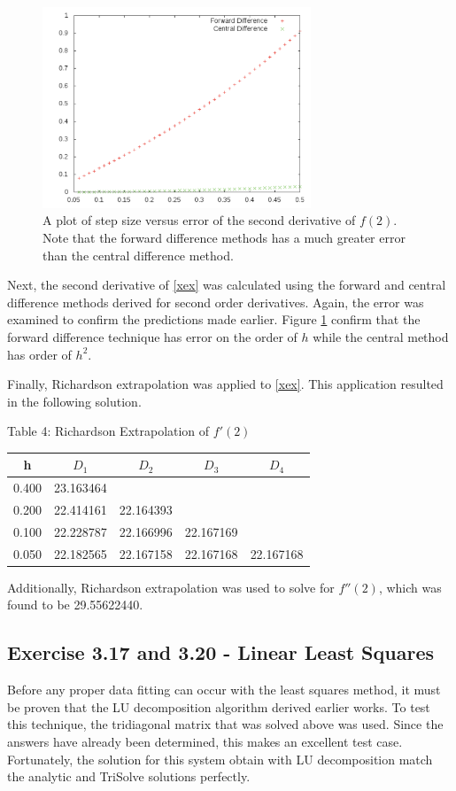 \documentclass[12pt]{article}
\begin{document}
\begin{figure}[!h]
\centering
\includegraphics[width =120 mm, height = 60mm]{Ex_3_13_2nd.pdf}
\caption{A plot of step size versus error of the second derivative of $f(2)$.  Note that the forward difference methods has a much greater error than the central difference method.}
\label{fig:3.13.2nd}
\end{figure}

Next, the second derivative of \eqref{xex} was calculated using the forward and central difference methods derived for second order derivatives.  Again, the error was examined to confirm the predictions made earlier.  Figure \ref{fig:3.13.2nd} confirm that the forward difference technique has error on the order of $h$ while the central method has order of $h^2$.

Finally, Richardson extrapolation was applied to \eqref{xex}.  This application resulted in the following solution.
\begin{center}
Table 4:  Richardson Extrapolation of $f'(2)$ \\
\begin{tabular}{ | c | c | c | c | c |}
\hline
h & $D_1$ & $D_2$ & $D_3$ & $D_4$ \\ \hline
0.400 & 23.163464 &  &  &  \\ \hline
0.200 & 22.414161 & 22.164393 &  &  \\ \hline
0.100 & 22.228787 & 22.166996 & 22.167169 & \\ \hline
0.050 & 22.182565 & 22.167158 & 22.167168 & 22.167168 \\ \hline
\end{tabular}
\end{center}
Additionally, Richardson extrapolation was used to solve for $f''(2)$, which was found to be 29.55622440.
\subsection{Exercise 3.17 and 3.20 - Linear Least Squares}
Before any proper data fitting can occur with the least squares method, it must be proven that the LU decomposition algorithm derived earlier works.  To test this technique, the tridiagonal matrix that was solved above was used.  Since the answers have already been determined, this makes an excellent test case.  Fortunately, the solution for this system obtain with LU decomposition match the analytic and TriSolve solutions perfectly.
\end{document}
